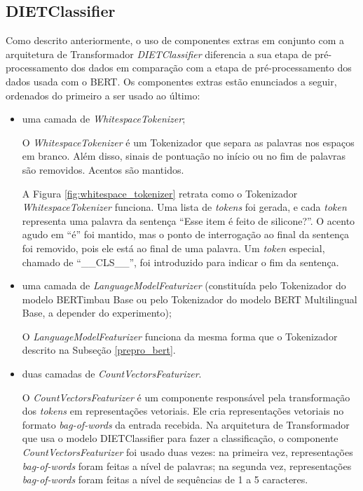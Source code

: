 \subsection{DIETClassifier}
\label{prepro_diet_classifier}
Como descrito anteriormente, o uso de componentes extras em conjunto com a arquitetura de Transformador \textit{DIETClassifier} diferencia a sua etapa de pré-processamento dos dados em comparação com a etapa de pré-processamento dos dados usada com o BERT. Os componentes extras estão enunciados a seguir, ordenados do primeiro a ser usado ao último:

\begin{itemize}
    \item uma camada de \textit{WhitespaceTokenizer};
    
    O \textit{WhitespaceTokenizer} é um Tokenizador que separa as palavras nos espaços em branco. Além disso, sinais de pontuação no início ou no fim de palavras são removidos. Acentos são mantidos. 
    
    A Figura \ref{fig:whitespace_tokenizer} retrata como o Tokenizador \textit{WhitespaceTokenizer} funciona. Uma lista de \textit{tokens} foi gerada, e cada \textit{token} representa uma palavra da sentença ``Esse item é feito de silicone?''. O acento agudo em ``é'' foi mantido, mas o ponto de interrogação ao final da sentença foi removido, pois ele está ao final de uma palavra. Um \textit{token} especial, chamado de ``\_\_CLS\_\_'', foi introduzido para indicar o fim da sentença.
    
    \item uma camada de \textit{LanguageModelFeaturizer} (constituída pelo Tokenizador do modelo BERTimbau Base ou pelo Tokenizador do modelo BERT Multilingual Base, a depender do experimento);

    O \textit{LanguageModelFeaturizer} funciona da mesma forma que o Tokenizador descrito na Subseção \ref{prepro_bert}.
    
    \item duas camadas de \textit{CountVectorsFeaturizer}.

    O \textit{CountVectorsFeaturizer} é um componente responsável pela transformação dos \textit{tokens} em representações vetoriais. Ele cria representações vetoriais no formato \textit{bag-of-words} da entrada recebida. Na arquitetura de Transformador que usa o modelo DIETClassifier para fazer a classificação, o componente \textit{CountVectorsFeaturizer} foi usado duas vezes: na primeira vez, representações \textit{bag-of-words} foram feitas a nível de palavras; na segunda vez, representações \textit{bag-of-words} foram feitas a nível de sequências de 1 a 5 caracteres. 
    

\end{itemize}
